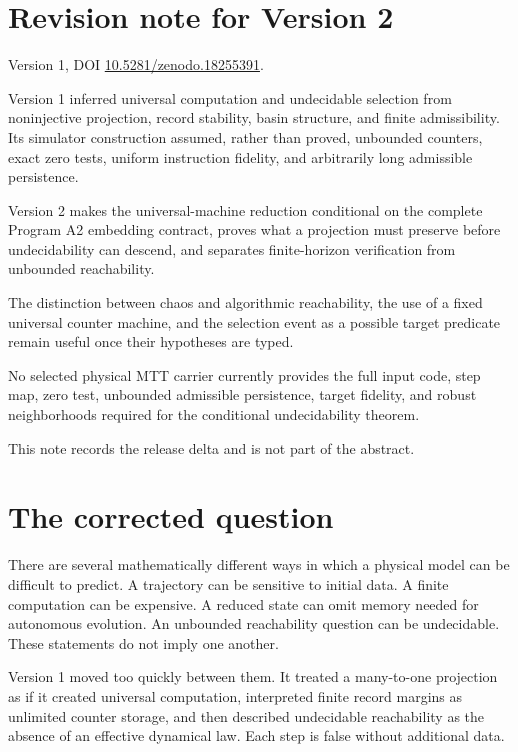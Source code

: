 \documentclass[11pt]{article}
\theoremstyle{definition}
\theoremstyle{remark}
\begin{document}
\section*{Revision note for Version 2}
\begin{description}[leftmargin=3.3cm,style=nextline]
\item[Supersedes.] Version 1, DOI
\href{https://doi.org/10.5281/zenodo.18255391}{10.5281/zenodo.18255391}.
\item[Reason.] Version 1 inferred universal computation and undecidable
selection from noninjective projection, record stability, basin structure, and
finite admissibility.  Its simulator construction assumed, rather than proved,
unbounded counters, exact zero tests, uniform instruction fidelity, and
arbitrarily long admissible persistence.
\item[Resolution.] Version 2 makes the universal-machine reduction conditional
on the complete Program A2 embedding contract, proves what a projection must
preserve before undecidability can descend, and separates finite-horizon
verification from unbounded reachability.
\item[Retained content.] The distinction between chaos and algorithmic
reachability, the use of a fixed universal counter machine, and the selection
event as a possible target predicate remain useful once their hypotheses are
typed.
\item[Remaining boundary.] No selected physical MTT carrier currently provides
the full input code, step map, zero test, unbounded admissible persistence,
target fidelity, and robust neighborhoods required for the conditional
undecidability theorem.
\end{description}

This note records the release delta and is not part of the abstract.

\tableofcontents

\section{The corrected question}

There are several mathematically different ways in which a physical model can
be difficult to predict.  A trajectory can be sensitive to initial data.  A
finite computation can be expensive.  A reduced state can omit memory needed
for autonomous evolution.  An unbounded reachability question can be
undecidable.  These statements do not imply one another.

Version 1 moved too quickly between them.  It treated a many-to-one projection
as if it created universal computation, interpreted finite record margins as
unlimited counter storage, and then described undecidable reachability as the
absence of an effective dynamical law.  Each step is false without additional
data.
\end{document}
